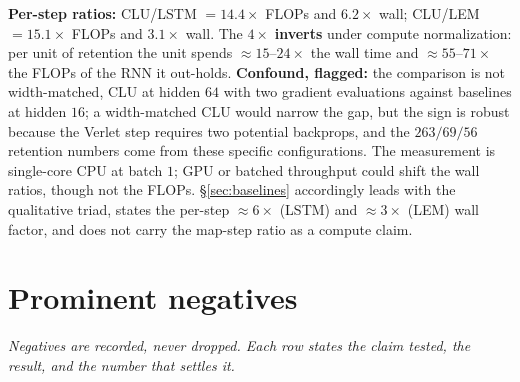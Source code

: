 \documentclass{article}
\begin{document}
\textbf{Per-step ratios:} CLU/LSTM $=14.4\times$ FLOPs and $6.2\times$ wall; CLU/LEM $=15.1\times$ FLOPs and $3.1\times$ wall. The $4\times$ \textbf{inverts} under compute normalization: per unit of retention the unit spends $\approx15$--$24\times$ the wall time and $\approx55$--$71\times$ the FLOPs of the RNN it out-holds. \textbf{Confound, flagged:} the comparison is not width-matched, CLU at hidden $64$ with two gradient evaluations against baselines at hidden $16$; a width-matched CLU would narrow the gap, but the sign is robust because the Verlet step requires two potential backprops, and the $263/69/56$ retention numbers come from these specific configurations. The measurement is single-core CPU at batch $1$; GPU or batched throughput could shift the wall ratios, though not the FLOPs. \S\ref{sec:baselines} accordingly leads with the qualitative triad, states the per-step $\approx6\times$ (LSTM) and $\approx3\times$ (LEM) wall factor, and does not carry the map-step ratio as a compute claim.

\section{Prominent negatives}\label{app:neg}

\emph{Negatives are recorded, never dropped. Each row states the claim tested, the result, and the number that settles it.}
\end{document}
